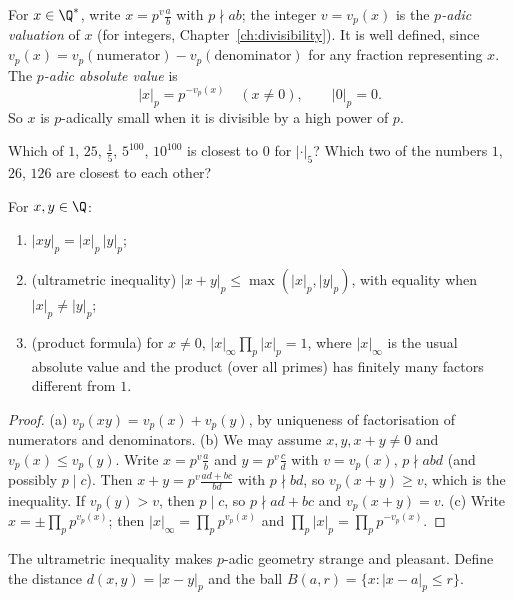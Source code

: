 For $x\in\Q^*$, write $x=p^v\frac ab$ with $p\nmid ab$; the integer $v=v_p(x)$ is the \emph{$p$-adic valuation} of $x$ (for integers, Chapter~\ref{ch:divisibility}). It is well defined, since $v_p(x)=v_p(\text{numerator})-v_p(\text{denominator})$ for any fraction representing $x$. The \emph{$p$-adic absolute value} is
\[
|x|_p=p^{-v_p(x)}\quad(x\ne0),\qquad|0|_p=0.
\]
So $x$ is $p$-adically small when it is divisible by a high power of $p$.

\begin{think}
Which of $1$, $25$, $\frac15$, $5^{100}$, $10^{100}$ is closest to $0$ for $|\cdot|_5$? Which two of the numbers $1$, $26$, $126$ are closest to each other?
\end{think}

\begin{proposition}\label{prop:ultra}
For $x,y\in\Q$:
\begin{enumerate}[label=(\alph*)]
\item $|xy|_p=|x|_p\,|y|_p$;
\item (ultrametric inequality) $|x+y|_p\le\max(|x|_p,|y|_p)$, with equality when $|x|_p\ne|y|_p$;
\item (product formula) for $x\ne0$, $\displaystyle|x|_\infty\prod_p|x|_p=1$, where $|x|_\infty$ is the usual absolute value and the product (over all primes) has finitely many factors different from $1$.
\end{enumerate}
\end{proposition}
\begin{proof}
(a) $v_p(xy)=v_p(x)+v_p(y)$, by uniqueness of factorisation of numerators and denominators. (b) We may assume $x,y,x+y\ne0$ and $v_p(x)\le v_p(y)$. Write $x=p^{v}\frac ab$ and $y=p^{v}\frac cd$ with $v=v_p(x)$, $p\nmid abd$ (and possibly $p\mid c$). Then $x+y=p^v\frac{ad+bc}{bd}$ with $p\nmid bd$, so $v_p(x+y)\ge v$, which is the inequality. If $v_p(y)>v$, then $p\mid c$, so $p\nmid ad+bc$ and $v_p(x+y)=v$. (c) Write $x=\pm\prod_pp^{v_p(x)}$; then $|x|_\infty=\prod_pp^{v_p(x)}$ and $\prod_p|x|_p=\prod_pp^{-v_p(x)}$.
\end{proof}

The ultrametric inequality makes $p$-adic geometry strange and pleasant. Define the distance $d(x,y)=|x-y|_p$ and the ball $B(a,r)=\{x:|x-a|_p\le r\}$.

